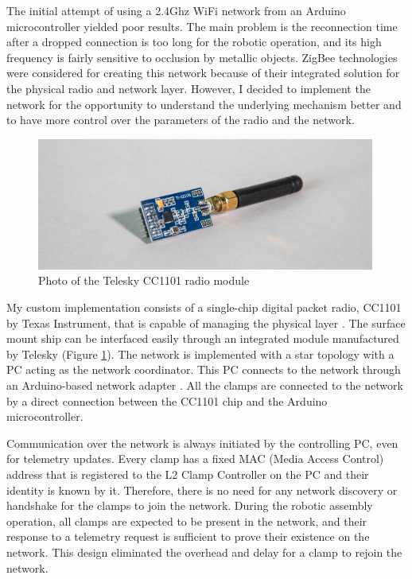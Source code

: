 The initial attempt of using a 2.4Ghz WiFi network from an Arduino microcontroller yielded poor results. The main problem is the reconnection time after a dropped connection is too long for the robotic operation, and its high frequency is fairly sensitive to occlusion by metallic objects. ZigBee technologies were considered for creating this network because of their integrated solution for the physical radio and network layer. However, I decided to implement the network for the opportunity to understand the underlying mechanism better and to have more control over the parameters of the radio and the network.

\begin{figure}
    \centering
    \includegraphics[width=0.99\textwidth]{images/05/image56.jpg}
    \caption{Photo of the Telesky CC1101 radio module}
    \label{fig:photo-cc1101}
\end{figure}

My custom implementation consists of a single-chip digital packet radio, CC1101 by Texas Instrument, that is capable of managing the physical layer \parencite{texasinstrumentsCC1101LowPowerSub12023}. The surface mount ship can be interfaced easily through an integrated module manufactured by Telesky (Figure \ref{fig:photo-cc1101}). The network is implemented with a star topology with a PC acting as the network coordinator. This PC connects to the network through an Arduino-based network adapter . All the clamps are connected to the network by a direct connection between the CC1101 chip and the Arduino microcontroller. 

Communication over the network is always initiated by the controlling PC, even for telemetry updates. Every clamp has a fixed MAC (Media Access Control) address that is registered to the L2 Clamp Controller  on the PC and their identity is known by it. Therefore, there is no need for any network discovery or handshake for the clamps to join the network. During the robotic assembly operation, all clamps are expected to be present in the network, and their response to a telemetry request is sufficient to prove their existence on the network. This design eliminated the overhead and delay for a clamp to rejoin the network.

